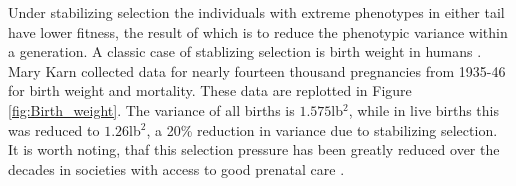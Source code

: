 Under stabilizing selection the individuals with extreme phenotypes in
either tail have lower fitness, the result of which is to reduce the
phenotypic variance within a generation. A classic case of stablizing selection
is birth weight in humans \citep{karn1951birth}. Mary Karn collected
data for nearly fourteen thousand pregnancies from 1935-46 for birth
weight and mortality. These data are replotted in Figure
\ref{fig:Birth_weight}. The variance of all births is $1.575$lb$^2$, while in live births this
was reduced to $1.26$lb$^2$, a 20\% reduction in variance due to
stabilizing selection. It is worth noting, thaf this selection
pressure has been greatly reduced over the decades in societies with
access to good prenatal care \citep{ulizzi1992natural}.  %


